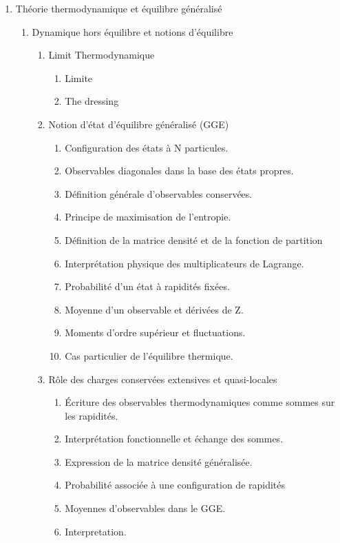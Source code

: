 \documentclass[8pt, landscape]{report}
\begin{document}
\begin{multicols}{3}
\begin{enumerate}
	\item Théorie thermodynamique et équilibre généralisé
		\begin{enumerate}
			\item Dynamique hors équilibre et notions d’équilibre 
				\begin{enumerate}
					\item Limit Thermodynamique 
						\begin{enumerate}
							\item Limite
							\item The dressing
						\end{enumerate}
					\item Notion d’état d’équilibre généralisé (GGE)
						\begin{enumerate}
							\item Configuration des états à N particules. 
							\item Observables diagonales dans la base des états propres. 
							\item Définition générale d’observables conservées.
							\item Principe de maximisation de l’entropie.
							\item Définition de la matrice densité et de la fonction de partition
							\item Interprétation physique des multiplicateurs de Lagrange.
							\item Probabilité d’un état à rapidités fixées.
							\item Moyenne d’un observable et dérivées de Z.
							\item Moments d’ordre supérieur et fluctuations.
							\item Cas particulier de l’équilibre thermique.
						\end{enumerate}
					\item Rôle des charges conservées extensives et quasi-locales
						\begin{enumerate}
							\item Écriture des observables thermodynamiques comme sommes sur les rapidités.
							\item Interprétation fonctionnelle et échange des sommes.
							\item Expression de la matrice densité généralisée. 
							\item Probabilité associée à une configuration de rapidités
							\item Moyennes d’observables dans le GGE.
							\item Interpretation. 

\end{enumerate}
\end{enumerate}
\end{enumerate}
\end{enumerate}
\end{multicols}
\end{document}
